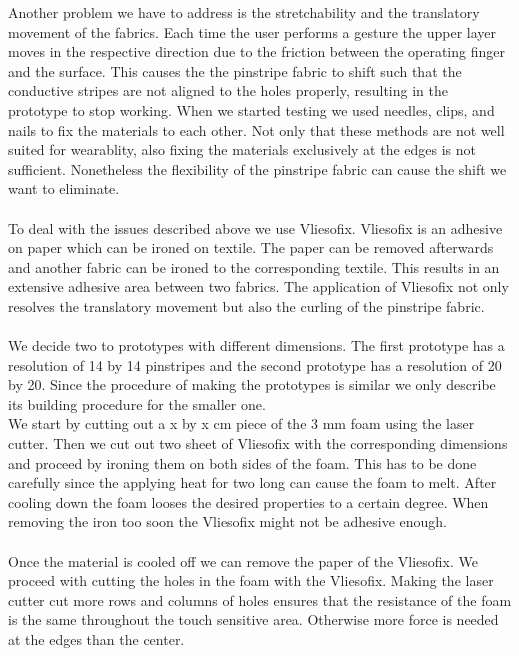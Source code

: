 Another problem we have to address is the stretchability and the translatory movement of the fabrics. Each time the user performs a gesture the upper layer moves in the respective direction due to the friction between the operating finger and the surface. This causes the the pinstripe fabric to shift such that the conductive stripes are not aligned to the holes properly, resulting in the prototype to stop working.  When we started testing we used needles, clips, and nails to fix the materials to each other. Not only that these methods are not well suited for wearablity, also fixing the materials exclusively at the edges is not sufficient. Nonetheless the flexibility of the pinstripe fabric can cause the shift we want to eliminate. 
\\ \\
 To deal with the issues described above we use Vliesofix.  Vliesofix is an adhesive on paper which can be ironed on textile. The paper can be removed afterwards and another fabric can be ironed to the corresponding textile. This results in an extensive adhesive area between two fabrics. The application of Vliesofix not only resolves the translatory movement but also the curling of the pinstripe fabric.
\\ \\
We decide two to prototypes with different dimensions. The first prototype has a resolution of 14 by 14 pinstripes and the second prototype has a resolution of 20 by 20. Since the procedure of making the prototypes is similar we only describe its building procedure for the smaller one. 
\\
We start by cutting out a  x by x cm piece of the 3 mm foam using the laser cutter. Then we cut out two sheet of Vliesofix with the corresponding dimensions and proceed by ironing them on both sides of the foam. This has to be done carefully since the applying heat for two long can cause the foam to melt. After cooling down the foam looses the desired properties to a certain degree. When removing the iron too soon the Vliesofix might not be adhesive enough. 
\\ \\
Once the material is cooled off we can remove the paper of the Vliesofix. We proceed with cutting the holes in the foam with the Vliesofix. Making the laser cutter cut more rows and columns of holes ensures that the resistance of the foam is the same throughout the touch sensitive area. Otherwise more force is needed at the edges than the center. 
